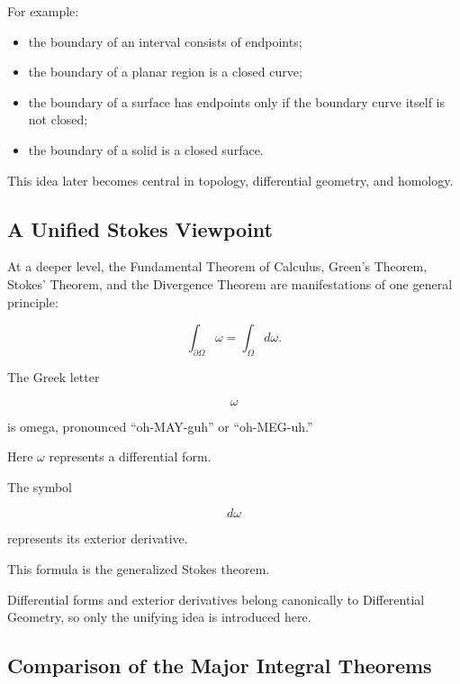 For example:

\begin{itemize}
    \item the boundary of an interval consists of endpoints;
    \item the boundary of a planar region is a closed curve;
    \item the boundary of a surface has endpoints only if the boundary curve
    itself is not closed;
    \item the boundary of a solid is a closed surface.
\end{itemize}

This idea later becomes central in topology, differential geometry, and
homology.

\subsection{A Unified Stokes Viewpoint}
\label{subsec:generalized-stokes-preview}

At a deeper level, the Fundamental Theorem of Calculus, Green's Theorem,
Stokes' Theorem, and the Divergence Theorem are manifestations of one
general principle:

\[ \boxed{\int_{\partial\Omega}\omega=\int_\Omega d\omega.} \]

The Greek letter

\[ \omega \]

is omega, pronounced ``oh-MAY-guh'' or ``oh-MEG-uh.''

Here \(\omega\) represents a differential form.

The symbol

\[ d\omega \]

represents its exterior derivative.

This formula is the generalized Stokes theorem.

Differential forms and exterior derivatives belong canonically to
Differential Geometry, so only the unifying idea is introduced here.

\subsection{Comparison of the Major Integral Theorems}
\label{subsec:integral-theorem-comparison}

